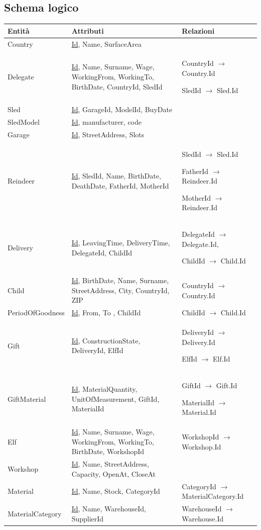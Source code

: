 \documentclass[12pt]{report}
\begin{document}
\subsection{Schema logico}

\begin{tabular}{|p{}|p{}|p{}|}
\hline
\textbf{Entità} & \textbf{Attributi} & \textbf{Relazioni} \\
\hline
Country & \underline{Id}, Name, SurfaceArea & \\
\hline
Delegate & \underline{Id}, Name, Surname, Wage, WorkingFrom, WorkingTo, BirthDate, CountryId, SledId & CountryId $\rightarrow$ Country.Id

SledId $\rightarrow$ Sled.Id \\ 
\hline
Sled & \underline{Id}, GarageId, ModelId, BuyDate & \\
\hline
SledModel & \underline{Id}, manufacturer, code &   \\ 
\hline
Garage & \underline{Id}, StreetAddress, Slots &  \\
\hline
Reindeer & \underline{Id}, SledId, Name, BirthDate, DeathDate, FatherId, MotherId & SledId $\rightarrow$ Sled.Id

FatherId $\rightarrow$ Reindeer.Id

MotherId $\rightarrow$ Reindeer.Id \\
\hline
Delivery & \underline{Id}, LeavingTime, DeliveryTime, DelegateId, ChildId & DelegateId $\rightarrow$ Delegate.Id,

ChildId $\rightarrow$ Child.Id \\ 
\hline
Child & \underline{Id}, BirthDate, Name, Surname, StreetAddress, City, CountryId, ZIP & CountryId $\rightarrow$ 
Country.Id \\
\hline
PeriodOfGoodness & \underline{Id}, From, To , ChildId & ChildId $\rightarrow$ Child.Id \\
\hline
Gift & \underline{Id}, ConstructionState, DeliveryId, ElfId & DeliveryId $\rightarrow$ Delivery.Id

ElfId $\rightarrow$ Elf.Id \\
\hline
GiftMaterial & \underline{Id}, MaterialQuantity, UnitOfMeasurement, GiftId, MaterialId & GiftId $\rightarrow$ Gift.Id

MaterialId $\rightarrow$ Material.Id \\
\hline
Elf & \underline{Id}, Name, Surname, Wage, WorkingFrom, WorkingTo, BirthDate, WorkshopId & WorkshopId $\rightarrow$ Workshop.Id \\
\hline
Workshop & \underline{Id}, Name, StreetAddress, Capacity, OpenAt, CloseAt &  \\
\hline
Material & \underline{Id}, Name, Stock, CategoryId & CategoryId $\rightarrow$ MaterialCategory.Id \\ 
\hline
MaterialCategory & \underline{Id}, Name, WarehouseId, SupplierId & WarehouseId $\rightarrow$ Warehouse.Id


\end{tabular}
\end{document}
